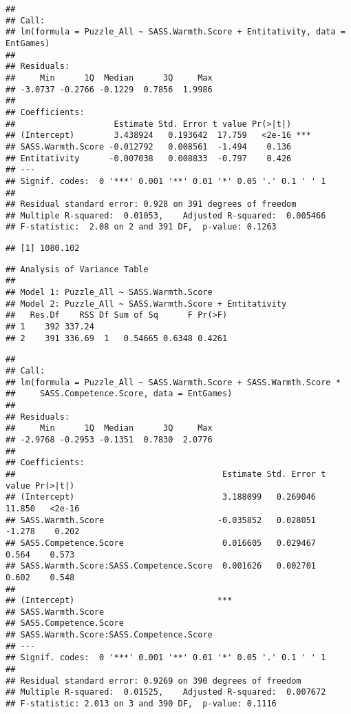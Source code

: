 \documentclass[
  doc,draftall]{apa6}
\begin{document}
\begin{verbatim}
## 
## Call:
## lm(formula = Puzzle_All ~ SASS.Warmth.Score + Entitativity, data = EntGames)
## 
## Residuals:
##     Min      1Q  Median      3Q     Max 
## -3.0737 -0.2766 -0.1229  0.7856  1.9986 
## 
## Coefficients:
##                    Estimate Std. Error t value Pr(>|t|)    
## (Intercept)        3.438924   0.193642  17.759   <2e-16 ***
## SASS.Warmth.Score -0.012792   0.008561  -1.494    0.136    
## Entitativity      -0.007038   0.008833  -0.797    0.426    
## ---
## Signif. codes:  0 '***' 0.001 '**' 0.01 '*' 0.05 '.' 0.1 ' ' 1
## 
## Residual standard error: 0.928 on 391 degrees of freedom
## Multiple R-squared:  0.01053,    Adjusted R-squared:  0.005466 
## F-statistic:  2.08 on 2 and 391 DF,  p-value: 0.1263
\end{verbatim}

\begin{verbatim}
## [1] 1080.102
\end{verbatim}

\begin{verbatim}
## Analysis of Variance Table
## 
## Model 1: Puzzle_All ~ SASS.Warmth.Score
## Model 2: Puzzle_All ~ SASS.Warmth.Score + Entitativity
##   Res.Df    RSS Df Sum of Sq      F Pr(>F)
## 1    392 337.24                           
## 2    391 336.69  1   0.54665 0.6348 0.4261
\end{verbatim}

\begin{verbatim}
## 
## Call:
## lm(formula = Puzzle_All ~ SASS.Warmth.Score + SASS.Warmth.Score * 
##     SASS.Competence.Score, data = EntGames)
## 
## Residuals:
##     Min      1Q  Median      3Q     Max 
## -2.9768 -0.2953 -0.1351  0.7830  2.0776 
## 
## Coefficients:
##                                          Estimate Std. Error t value Pr(>|t|)
## (Intercept)                              3.188099   0.269046  11.850   <2e-16
## SASS.Warmth.Score                       -0.035852   0.028051  -1.278    0.202
## SASS.Competence.Score                    0.016605   0.029467   0.564    0.573
## SASS.Warmth.Score:SASS.Competence.Score  0.001626   0.002701   0.602    0.548
##                                            
## (Intercept)                             ***
## SASS.Warmth.Score                          
## SASS.Competence.Score                      
## SASS.Warmth.Score:SASS.Competence.Score    
## ---
## Signif. codes:  0 '***' 0.001 '**' 0.01 '*' 0.05 '.' 0.1 ' ' 1
## 
## Residual standard error: 0.9269 on 390 degrees of freedom
## Multiple R-squared:  0.01525,    Adjusted R-squared:  0.007672 
## F-statistic: 2.013 on 3 and 390 DF,  p-value: 0.1116
\end{verbatim}
\end{document}
